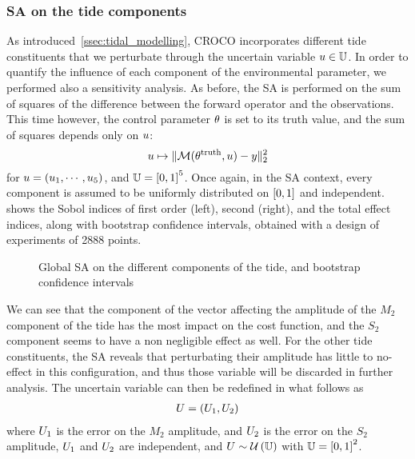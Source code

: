 \documentclass[../../Main_ManuscritThese.tex]{subfiles}
\newcommand{\CROCO}{CROCO}
\newcommand\imgpath{/home/victor/acadwriting/Manuscrit/Text/Chapter5/img/}
\begin{document}
\subsubsection{SA on the tide components}
\label{ssec:SA_tide}
As introduced~\cref{ssec:tidal_modelling}, \CROCO{} incorporates
different tide constituents that we perturbate through the uncertain
variable $u\in\mathbb{U}$. In order to quantify the influence of each
component of the environmental parameter, we performed also a
sensitivity analysis. As before, the SA is performed on the sum of
squares of the difference between the forward operator and the
observations. This time however, the control parameter $\theta$ is set to its
truth value, and the sum of squares depends only on $u$:
\begin{equation}
  u \mapsto  \| \mathcal{M}(\theta^{\mathrm{truth}}, u) - y \|_2^2
\end{equation}
for $u = (u_1,\cdots,u_5)$, and $\Uspace = \interval{0}{1}^5$.
Once again, in the SA context, every component is assumed to be
uniformly distributed on $\interval{0}{1}$ and independent.
 shows the Sobol indices of first order (left),
second (right), and the total effect indices, along with bootstrap
confidence intervals, obtained with a design of experiments of
\num{2888} points.
\begin{figure}[ht]
  \centering
  
  \caption[SA on the tide components]{\label{fig:SA_tides} Global SA
    on the different components of the tide, and bootstrap confidence
    intervals}
\end{figure}

We can see that the component of the vector affecting the amplitude of
the $M_2$ component of the tide has the most impact on the cost
function, and the $S_2$ component seems to have a non negligible
effect as well. For the other tide constituents, the SA reveals that
perturbating their amplitude has little to no-effect in this
configuration, and thus those variable will be discarded in further
analysis. The uncertain variable can then be redefined in what follows as
\begin{align}
  \UU = (\UU_1, \UU_2)%
\end{align}
where $U_1$ is the error on the $M_2$ amplitude, and $U_2$ is the
error on the $S_2$ amplitude, $U_1$ and $U_2$ are independent, and
$U \sim \mathcal{U}\left(\mathbb{U}\right)$ with
$\Uspace = \interval{0}{1}^2$.
\end{document}
